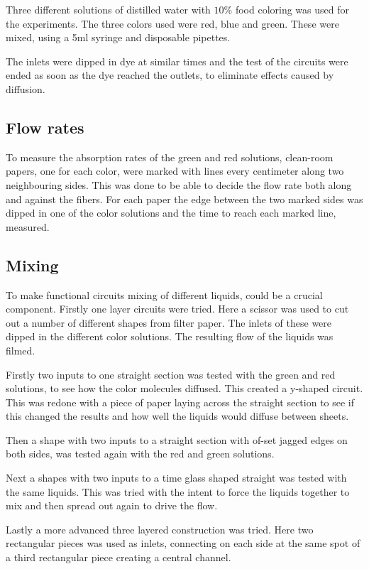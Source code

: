 Three different solutions of distilled water with $10\%$ food coloring was used for the experiments. The three colors used were red, blue and green. These were mixed, using a 5ml syringe and disposable pipettes.

The inlets were dipped in dye at similar times and the test of the circuits were ended as soon as the dye reached the outlets, to eliminate effects caused by diffusion.

\subsection{Flow rates}
To measure the absorption rates of the green and red solutions, clean-room papers, one for each color, were marked with lines every centimeter along two neighbouring sides. This was done to be able to decide the flow rate both along and against the fibers. For each paper the edge between the two marked sides was dipped in one of the color solutions and the time to reach each marked line, measured. 

\subsection{Mixing}
To make functional circuits mixing of different liquids, could be a crucial component. Firstly one layer circuits were tried. Here a scissor was used to cut out a number of different shapes from filter paper. The inlets of these were dipped in the different color solutions. The resulting flow of the liquids was filmed.

Firstly two inputs to one straight section was tested with the green and red solutions, to see how the color molecules diffused. This created a y-shaped circuit. This was redone with a piece of paper laying across the straight section to see if this changed the results and how well the liquids would diffuse between sheets.

Then a shape with two inputs to a straight section with of-set jagged edges on both sides, was tested again with the red and green solutions. 

Next a shapes with two inputs to a time glass shaped straight was tested with the same liquids. This was tried with the intent to force the liquids together to mix and then spread out again to drive the flow.

Lastly a more advanced three layered construction was tried. Here two rectangular pieces was used as inlets, connecting on each side at the same spot of a third rectangular piece creating a central channel.

